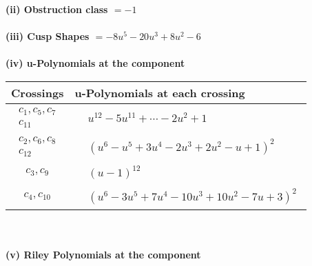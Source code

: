 \documentclass[1p]{elsarticle_modified}
\theoremstyle{definition}
\begin{document}
\flushleft \textbf{(ii) Obstruction class $= -1$}\\~\\
\flushleft \textbf{(iii) Cusp Shapes $= -8 u^5-20 u^3+8 u^2-6$}\\~\\
\newpage\renewcommand{\arraystretch}{1}
\flushleft \textbf{(iv) u-Polynomials at the component}\newline \\
\begin{tabular}{m{50pt}|m{274pt}}
Crossings & \hspace{64pt}u-Polynomials at each crossing \\
\hline $$\begin{aligned}c_{1},c_{5},c_{7}\\c_{11}\end{aligned}$$&$\begin{aligned}
&u^{12}-5 u^{11}+\cdots-2 u^2+1
\end{aligned}$\\
\hline $$\begin{aligned}c_{2},c_{6},c_{8}\\c_{12}\end{aligned}$$&$\begin{aligned}
&(u^6- u^5+3 u^4-2 u^3+2 u^2- u+1)^2
\end{aligned}$\\
\hline $$\begin{aligned}c_{3},c_{9}\end{aligned}$$&$\begin{aligned}
&(u-1)^{12}
\end{aligned}$\\
\hline $$\begin{aligned}c_{4},c_{10}\end{aligned}$$&$\begin{aligned}
&(u^6-3 u^5+7 u^4-10 u^3+10 u^2-7 u+3)^2
\end{aligned}$\\
\hline
\end{tabular}\\~\\
\newpage\renewcommand{\arraystretch}{1}
\flushleft \textbf{(v) Riley Polynomials at the component}\newline \\
\end{document}
